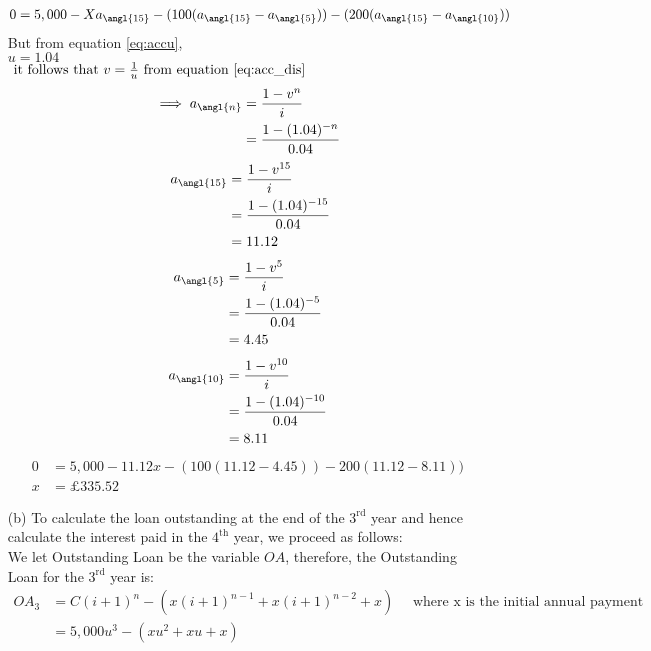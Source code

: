 \documentclass[12pt,a4paper]{article}
\begin{document}
\begin{enumerate}
\begin{align*}
 0 =  5,000  -  Xa_{ \angl{15} } - (100 (a_{ \angl{15} }  - a_{ \angl{5} } )) -  (200( a_{ \angl{15} }  - a_{ \angl{10} })) 
\end{align*}
But from equation \eqref{eq:accu}, \\
$u  =  1.04$\\
 $\text{ it follows that }  v  = \frac{1}{u} \text{ from equation }  \eqref{eq:acc_dis}$\\
\begin{align*}
		\implies   a_{\angl{n}}  &=  \frac{1-v^n}{i} \\
		                     &= \frac{1  -  (1.04)^{-n }}{0.04}
\end{align*}
\begin{align*}
		\ a_{\angl{15}}  &=  \frac{1-v^{15}}{i}  \\
		                     &= \frac{1  -  (1.04)^{-15 }}{0.04}\\
		                     &=  11.12
\end{align*}
\begin{align*}
		 a_{\angl{5}}  &=  \frac{1-v^{5}}{i}  \\
		                     &= \frac{1  -  (1.04)^{-5 }}{0.04}\\
		                     &=  4.45
\end{align*}
\begin{align*}
		a_{\angl{10}}  &=  \frac{1-v^{10}}{i}  \\
		                     &= \frac{1  -  (1.04)^{-10 }}{0.04}\\
		                     &=  8.11
\end{align*}
\begin{align*}
		0  &=  5,000 -  11.12x -  (100(11.12 - 4.45)) -  200(11.12 - 8.11))\\
		x  &=  \pounds 335.52
\end{align*}
\item[(b)] To calculate the loan outstanding at the end of the $3^{\text{rd}}$ year and hence calculate the interest paid in
the $4^{\text{th}}$ year, we proceed as follows:\\
We let Outstanding Loan be the variable $OA$,  therefore,  the Outstanding Loan for the $3^{\text{rd}}$ year is:\\
\begin{align*}
	 OA_{3} &=  C(i+1)^n -  (x(i+1)^{n-1} + x(i+1)^{n-2} + x) \quad \text{ where x is  the initial annual payment}\\
	&= 5,000 u^3 - (xu^2 + xu + x)\\

\end{align*}
\end{enumerate}
\end{document}
